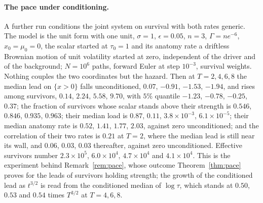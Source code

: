 \paragraph{The pace under conditioning.} A further run conditions the
joint system on survival with both rates generic. The model is the unit
form with one unit, $\sigma=1$, $\epsilon=0.05$, $n=3$, $\Gamma=ne^{-6}$,
$x_0=\mu_0=0$, the scalar started at $\tau_0=1$ and its anatomy rate a
driftless Brownian motion of unit volatility started at zero, independent
of the driver and of the background; $N=10^6$ paths, forward Euler at
step $10^{-3}$, survival weights. Nothing couples the two coordinates but
the hazard. Then at $T=2,4,6,8$ the median lead on $\{x>0\}$ falls
unconditioned, $0.07$, $-0.91$, $-1.53$, $-1.94$, and rises
among survivors, $0.14$, $2.24$, $5.58$, $9.70$, with
$5\%$ quantile $-1.23$, $-0.78$, $-0.25$, $0.37$; the fraction
of survivors whose scalar stands above their strength is $0.546$,
$0.846$, $0.935$, $0.963$; their median load is $0.87$, $0.11$,
$3.8\times10^{-3}$, $6.1\times10^{-5}$; their median anatomy rate is $0.52$, $1.41$,
$1.77$, $2.03$, against zero unconditioned; and the correlation of their two rates is
$0.21$ at $T=2$, where the median lead is still near its wall, and
$0.06$, $0.03$, $0.03$ thereafter, against zero unconditioned. Effective
survivors number $2.3\times10^{5}$, $6.0\times10^{4}$, $4.7\times10^{4}$ and $4.1\times10^{4}$. This is
the experiment behind Remark~\ref{rem:pace}, whose outcome Theorem~\ref{thm:pace} proves for the leads of survivors holding strength; the growth of the conditioned lead
as $t^{3/2}$ is read from the conditioned median of $\log\tau$, which
stands at $0.50$, $0.53$ and $0.54$ times $T^{3/2}$ at
$T=4,6,8$.

